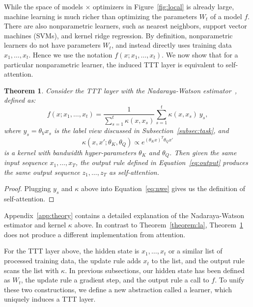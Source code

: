 \documentclass{article}
\newtheorem{theorem}{Theorem}
\begin{document}
While the space of models $\times$ optimizers in Figure~\ref{fig:local} is already large, 
machine learning is much richer than optimizing the parameters $W_t$ of a model $f$.
There are also nonparametric learners, such as nearest neighbors, support vector machines (SVMs), and kernel ridge regression.
By definition, nonparametric learners do not have parameters $W_t$, and instead directly uses training data $x_1,\dots,x_t$. 
Hence we use the notation $f(x; x_1, \dots, x_t)$.
We now show that for a particular nonparametric learner, the induced TTT layer is equivalent to self-attention. 
\begin{theorem}
\label{theorem:sa}
Consider the TTT layer with the Nadaraya-Watson estimator~\cite{bierens1988nadaraya, cai2001weighted}, defined as:
\begin{equation}
\label{eq:nwe}
    f(x; x_1, \dots, x_t) = \frac{1}{\sum_{s=1}^t \kappa(x, x_s)} \sum_{s=1}^t \kappa(x, x_s) ~y_s,
\end{equation}
where $y_s = \theta_Vx_s$ is the label view discussed in Subsection~\ref{subsec:task}, and 
\begin{equation}
\label{eq:kernel}
\kappa\left(x, x'; \theta_K, \theta_Q\right) \propto e^{(\theta_Kx)^T \theta_Qx'}
\end{equation}
is a kernel with bandwidth hyper-parameters $\theta_K$ and $\theta_Q$.
Then given the same input sequence $x_1,\dots,x_T$, the output rule defined in Equation~\ref{eq:output} produces the same output sequence $z_1,\dots,z_T$ as self-attention.
\end{theorem}
\begin{proof}
Plugging $y_s$ and $\kappa$ above into Equation~\ref{eq:nwe} gives us the definition of self-attention.
\end{proof}
Appendix~\ref{app:theory} contains a detailed explanation of the Nadaraya-Watson estimator and kernel $\kappa$ above.
In contrast to Theorem~\ref{theorem:la}, Theorem~\ref{theorem:sa} does not produce a different implementation from attention.

For the TTT layer above, the hidden state is $x_1, \dots, x_t$ or a similar list of processed training data, the update rule adds $x_t$ to the list, and the output rule scans the list with $\kappa$.
In previous subsections, our hidden state has been defined as $W_t$, the update rule a gradient step, and the output rule a call to $f$. 
To unify these two constructions, we define a new abstraction called a learner, which uniquely induces a TTT layer.
\end{document}
